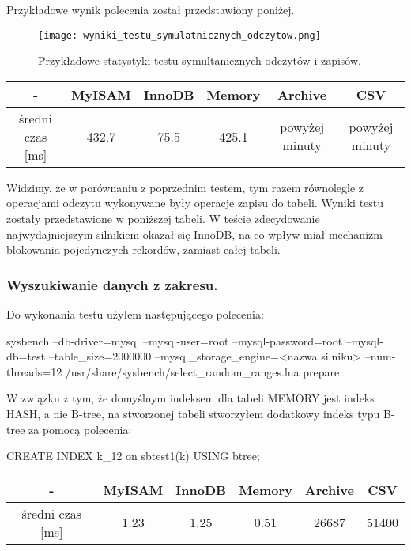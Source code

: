 Przykładowe wynik polecenia został przedstawiony poniżej.
\begin{figure}[H]
	\caption{Przykładowe statystyki testu symultanicznych odczytów i zapisów.}
	\centering
	\texttt{[image: wyniki\_testu\_symulatnicznych\_odczytow.png]}
	\label{fig:label}
\end{figure}
\begin{center}
	\begin{tabular}{ | c | c | c | c | c | c |}
		\hline
		- & MyISAM & InnoDB & Memory & Archive & CSV  \\ 
		\hline
		średni czas [ms] & 432.7 & 75.5 & 425.1 & powyżej minuty & powyżej minuty \\
		\hline
	\end{tabular}
\end{center}
Widzimy, że w porównaniu z poprzednim testem, tym razem równolegle z operacjami odczytu wykonywane były operacje zapisu do tabeli. Wyniki testu zostały przedstawione w poniższej tabeli. W teście zdecydowanie najwydajniejszym silnikiem okazał się InnoDB, na co wpływ miał mechanizm blokowania pojedynczych rekordów, zamiast całej tabeli.

\subsubsection{Wyszukiwanie danych z zakresu.}

Do wykonania testu użyłem następującego polecenia:
\begin{spverbatim}
	sysbench --db-driver=mysql --mysql-user=root --mysql-password=root --mysql-db=test --table_size=2000000 --mysql_storage_engine=<nazwa silniku> --num-threads=12 /usr/share/sysbench/select_random_ranges.lua prepare
\end{spverbatim}
W związku z tym, że domyślnym indeksem dla tabeli MEMORY jest indeks HASH, a nie B-tree, na stworzonej tabeli stworzyłem dodatkowy indeks typu B-tree za pomocą polecenia:
\begin{spverbatim}
	CREATE INDEX k_12 on sbtest1(k) USING btree;
\end{spverbatim}
\begin{center}
	\begin{tabular}{ | c | c | c | c | c | c |}
		\hline
		- & MyISAM & InnoDB & Memory & Archive & CSV  \\ 
		\hline
		średni czas [ms] & 1.23 & 1.25 & 0.51 & 26687 & 51400 \\
		\hline
	\end{tabular}
\end{center}

